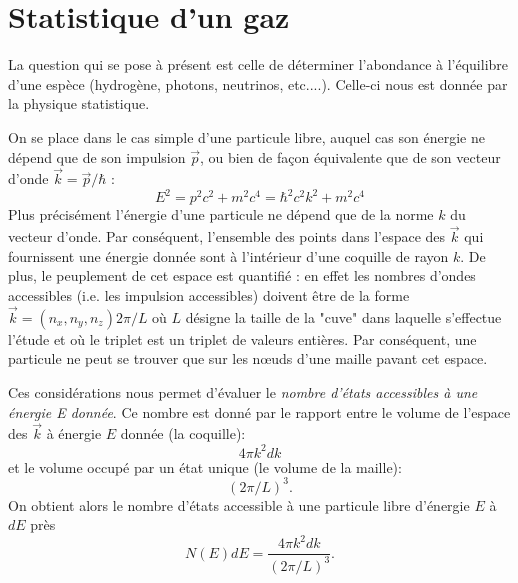 \section{Statistique d'un gaz}
La question qui se pose à présent est celle de déterminer l'abondance à l'équilibre d'une espèce (hydrogène, photons, neutrinos, etc....). Celle-ci nous est donnée par la physique statistique.

On se place dans le cas simple d'une particule libre, auquel cas son énergie ne dépend que de son impulsion $\vec p$, ou bien de façon équivalente que de son vecteur d'onde $\vec k =\vec p /\hbar$ :
\begin{equation}
E^2=p^2c^2+m^2c^4=\hbar^2 c^2 k^2 +m^2c^4
\end{equation}
 Plus précisément l'énergie d'une particule ne dépend que de la norme $k$ du vecteur d'onde. Par conséquent, l'ensemble des points dans l'espace des $\vec k$ qui fournissent une énergie donnée sont à l'intérieur d'une coquille de rayon $k$. De plus, le peuplement de cet espace est quantifié : en effet les nombres d'ondes accessibles (i.e. les impulsion accessibles) doivent être de la forme $\vec k = (n_x,n_y,n_z) 2\pi/L $ où $L$ désigne la taille de la "cuve" dans laquelle s'effectue l'étude et où le triplet est un triplet de valeurs entières. Par conséquent, une particule ne peut se trouver que sur les nœuds d'une maille pavant cet espace. 

Ces considérations nous permet d'évaluer le \textit{nombre d'états accessibles à une énergie E donnée}. Ce nombre est donné par le rapport entre le volume de l'espace des $\vec k$ à énergie $E$ donnée (la coquille):
\begin{equation}
4\pi k^2 dk
\end{equation} 
et le volume occupé par un état unique (le volume de la maille):
\begin{equation}
(2\pi/L)^3.
\end{equation}
On obtient alors le nombre d'états accessible à une particule libre d'énergie $E$ à $dE$ près 
\begin{equation}
N(E)dE=\frac{4\pi k^2 dk}{(2\pi/L)^3}.
\label{e:densetat}
\end{equation}


